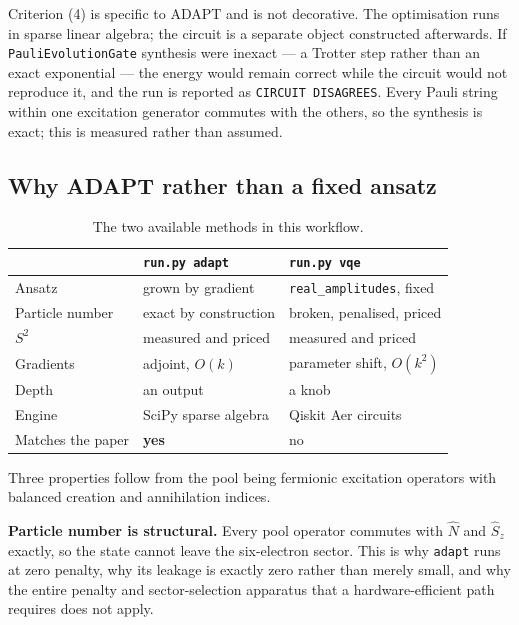 \documentclass[11pt,a4paper]{article}
\newcommand{\code}[1]{\texttt{\small #1}}
\begin{document}
Criterion (4) is specific to ADAPT and is not decorative. The optimisation runs
in sparse linear algebra; the circuit is a separate object constructed
afterwards. If \code{PauliEvolutionGate} synthesis were inexact --- a Trotter
step rather than an exact exponential --- the energy would remain correct while
the circuit would not reproduce it, and the run is reported as
\code{CIRCUIT DISAGREES}. Every Pauli string within one excitation generator
commutes with the others, so the synthesis is exact; this is measured rather
than assumed.

\subsection{Why ADAPT rather than a fixed ansatz}

\begin{table}[htbp]
\centering
\caption{The two available methods in this workflow.}
\label{tab:methods}
\small
\begin{tabular}{lll}
\toprule
& \code{run.py adapt} & \code{run.py vqe} \\
\midrule
Ansatz            & grown by gradient        & \code{real\_amplitudes}, fixed \\
Particle number   & exact by construction    & broken, penalised, priced \\
$S^2$             & measured and priced      & measured and priced \\
Gradients         & adjoint, $O(k)$          & parameter shift, $O(k^2)$ \\
Depth             & an output                & a knob \\
Engine            & SciPy sparse algebra     & Qiskit Aer circuits \\
Matches the paper & \textbf{yes}             & no \\
\bottomrule
\end{tabular}
\end{table}

Three properties follow from the pool being fermionic excitation operators with
balanced creation and annihilation indices.

\textbf{Particle number is structural.} Every pool operator commutes with
$\hat N$ and $\hat S_z$ exactly, so the state cannot leave the six-electron
sector. This is why \code{adapt} runs at zero penalty, why its leakage is
exactly zero rather than merely small, and why the entire penalty and
sector-selection apparatus that a hardware-efficient path requires does not
apply.
\end{document}
